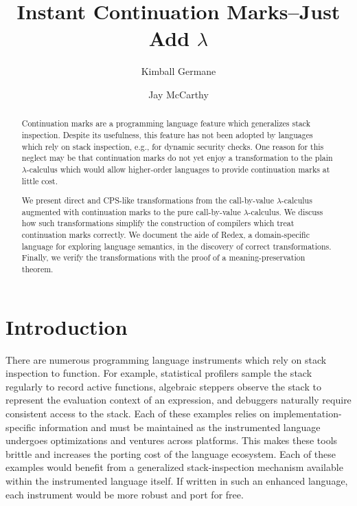 \documentclass{llncs}
\title{Instant Continuation Marks--Just Add $\lambda$}
\author{Kimball Germane \and Jay McCarthy}
\institute{Brigham Young University}
\begin{document}
\maketitle

\begin{abstract}
Continuation marks are a programming language feature which generalizes stack inspection. Despite its usefulness, this feature has not been adopted by languages which rely on stack inspection, e.g., for dynamic security checks. One reason for this neglect may be that continuation marks do not yet enjoy a transformation to the plain $\lambda$-calculus which would allow higher-order languages to provide continuation marks at little cost.

We present direct and CPS-like transformations from the call-by-value $\lambda$-calculus augmented with continuation marks to the pure call-by-value $\lambda$-calculus. We discuss how such transformations simplify the construction of compilers which treat continuation marks correctly. We document the aide of Redex, a domain-specific language for exploring language semantics, in the discovery of correct transformations. Finally, we verify the transformations with the proof of a meaning-preservation theorem.
\end{abstract}

\section{Introduction}


There are numerous programming language instruments which rely on stack inspection to function. For example, statistical profilers sample the stack regularly to record active functions, algebraic steppers observe the stack to represent the evaluation context of an expression, and debuggers naturally require consistent access to the stack. Each of these examples relies on implementation-specific information and must be maintained as the instrumented language undergoes optimizations and ventures across platforms. This makes these tools brittle and increases the porting cost of the language ecosystem. Each of these examples would benefit from a generalized stack-inspection mechanism available within the instrumented language itself. If written in such an enhanced language, each instrument would be more robust and port for free.
\end{document}
